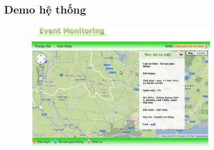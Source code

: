 \documentclass{beamer}
\numberwithin{equation}{section}
\begin{document}
  \subsection{Demo hệ thống}
  \begin{frame}
      \begin{figure}[ht]
		\centering
		\includegraphics[width=4in, height=2.5in]{img/map1}
		\label{fig:model}
	\end{figure}

      \end{frame}
















\section*{}
\end{document}
